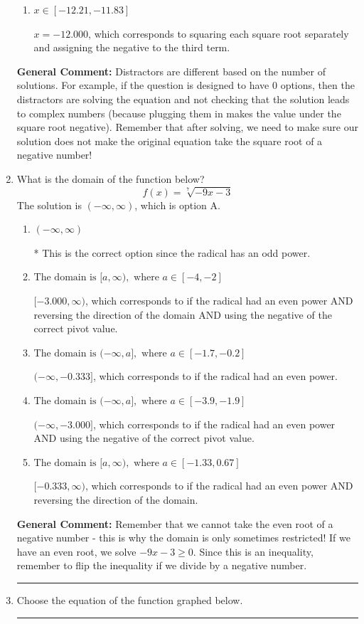 \documentclass{extbook}[14pt]
\newcommand{\litem}[1]{\item #1

\rule{\textwidth}{0.4pt}}
\begin{document}
\begin{enumerate}
{\begin{enumerate}[label=\Alph*.]
$x = -0.500$ and $x = 4.000$, which corresponds to solving the equation correctly and including the value that makes the first square root 0.
\item \( x \in [-12.21,-11.83] \)

$x = -12.000$, which corresponds to squaring each square root separately and assigning the negative to the third term.
\end{enumerate}

\textbf{General Comment:} Distractors are different based on the number of solutions. For example, if the question is designed to have 0 options, then the distractors are solving the equation and not checking that the solution leads to complex numbers (because plugging them in makes the value under the square root negative). Remember that after solving, we need to make sure our solution does not make the original equation take the square root of a negative number!
}
\litem{
What is the domain of the function below?
\[ f(x) = \sqrt[7]{-9 x - 3} \]The solution is \( (-\infty, \infty) \), which is option A.\begin{enumerate}[label=\Alph*.]
\item \( (-\infty, \infty) \)

* This is the correct option since the radical has an odd power.
\item \( \text{The domain is } [a, \infty), \text{   where } a \in [-4, -2] \)

$[-3.000, \infty)$, which corresponds to if the radical had an even power AND reversing the direction of the domain AND using the negative of the correct pivot value.
\item \( \text{The domain is } (-\infty, a], \text{   where } a \in [-1.7, -0.2] \)

$(-\infty, -0.333]$, which corresponds to if the radical had an even power.
\item \( \text{The domain is } (-\infty, a], \text{   where } a \in [-3.9, -1.9] \)

$(-\infty, -3.000]$, which corresponds to if the radical had an even power AND using the negative of the correct pivot value.
\item \( \text{The domain is } [a, \infty), \text{   where } a \in [-1.33, 0.67] \)

$[-0.333, \infty)$, which corresponds to if the radical had an even power AND reversing the direction of the domain.
\end{enumerate}

\textbf{General Comment:} Remember that we cannot take the even root of a negative number - this is why the domain is only sometimes restricted! If we have an even root, we solve $-9 x - 3 \geq 0$. Since this is an inequality, remember to flip the inequality if we divide by a negative number.
}
\litem{
Choose the equation of the function graphed below.

}
\end{enumerate}
\end{document}
